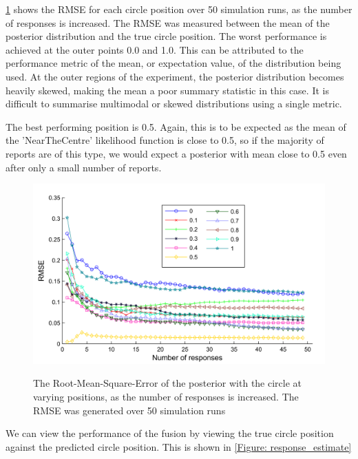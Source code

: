 \ref{Figure:MC RMSE} shows the RMSE for each circle position over 50 simulation runs, as the number of responses is increased. 
The RMSE was measured between the mean of the posterior distribution and the true circle position. 
The worst performance is achieved at the outer points 0.0 and 1.0. 
This can be attributed to the performance metric of the mean, or expectation value, of the distribution being used. 
At the outer regions of the experiment, the posterior distribution becomes heavily skewed, making the mean a poor summary statistic in this case. 
It is difficult to summarise multimodal or skewed distributions using a single metric.

The best performing position is 0.5. 
Again, this is to be expected as the mean of the 'NearTheCentre' likelihood function is close to 0.5, so if the majority of reports are of this type, we would expect a posterior with mean close to 0.5 even after only a small number of reports.


\begin{figure}
	\centering
	\includegraphics[scale=1]{line_RMSE.png}
	\label{Figure:MC RMSE}
	\caption{The Root-Mean-Square-Error of the posterior with the circle at varying positions, as the number of responses is increased. The RMSE was generated over 50 simulation runs}
\end{figure}


We can view the performance of the fusion by viewing the true circle position against the predicted circle position. 
This is shown in \ref{Figure: response_estimate}

